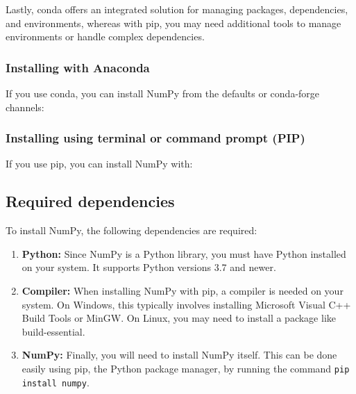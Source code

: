 \bigskip

Lastly, conda offers an integrated solution for managing packages, dependencies, and environments, whereas with pip, you may need additional tools to manage environments or handle complex dependencies.

\subsubsection{Installing with Anaconda}

If you use conda, you can install NumPy from the defaults or conda-forge channels:

\begin{code}[h!]
	    
	\caption{Installing NumPy using terminal}
	
\end{code}	

\subsubsection{Installing using terminal or command prompt (PIP)}

If you use pip, you can install NumPy with:	

\begin{code}[h!]
	    
	\caption{Installing NumPy using PIP}
\end{code}	


\subsection{Required dependencies}

To install NumPy, the following dependencies are required:

\begin{enumerate}
	\item \textbf{Python:} Since NumPy is a Python library, you must have Python installed on your system. It supports Python versions 3.7 and newer.
	
	\item \textbf{Compiler:} When installing NumPy with pip, a compiler is needed on your system. On Windows, this typically involves installing Microsoft Visual C++ Build Tools or MinGW. On Linux, you may need to install a package like build-essential.
	
	\item \textbf{NumPy:} Finally, you will need to install NumPy itself. This can be done easily using pip, the Python package manager, by running the command \texttt{pip install numpy}.
	
\end{enumerate}

